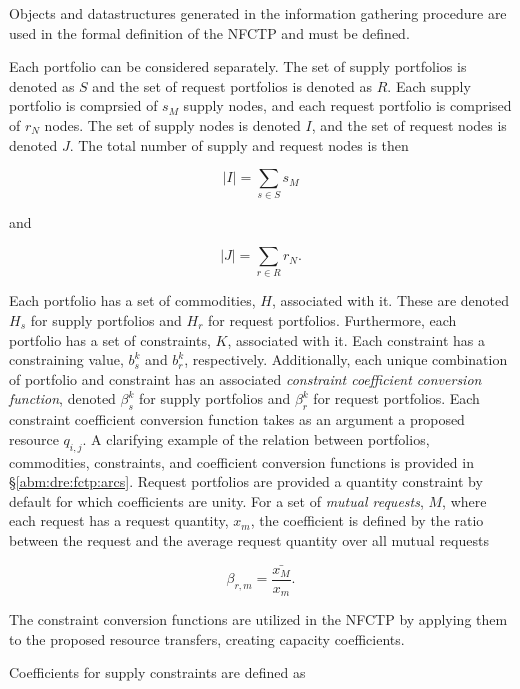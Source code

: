 Objects and datastructures generated in the information gathering procedure are
used in the formal definition of the NFCTP and must be defined.

Each portfolio can be considered separately. The set of supply portfolios is
denoted as $S$ and the set of request portfolios is denoted as $R$. Each supply
portfolio is comprsied of $s_M$ supply nodes, and each request portfolio is
comprised of $r_N$ nodes. The set of supply nodes is denoted $I$, and the set
of request nodes is denoted $J$. The total number of supply and request nodes is
then

\begin{equation}
  \left|{I}\right| = \sum_{s \in S} s_M
\end{equation}

and

\begin{equation}
  \left|{J}\right| = \sum_{r \in R} r_N.
\end{equation}

Each portfolio has a set of commodities, $H$, associated with it. These are
denoted $H_s$ for supply portfolios and $H_r$ for request
portfolios. Furthermore, each portfolio has a set of constraints, $K$,
associated with it. Each constraint has a constraining value, $b_s^k$ and
$b_r^k$, respectively. Additionally, each unique combination of portfolio and
constraint has an associated \textit{constraint coefficient conversion
  function}, denoted $\beta_s^k$ for supply portfolios and $\beta_r^k$ for
request portfolios. Each constraint coefficient conversion function takes as an
argument a proposed resource $q_{i,j}$. A clarifying example of the relation
between portfolios, commodities, constraints, and coefficient conversion
functions is provided in \S \ref{abm:dre:fctp:arcs}. Request portfolios are
provided a quantity constraint by default for which coefficients are unity. For
a set of \textit{mutual requests}, $M$, where each request has a request
quantity, $x_m$, the coefficient is defined by the ratio between the request and
the average request quantity over all mutual requests

\begin{equation}
  \beta_{r, m} = \frac{\bar{x_M}}{x_m}.
\end{equation}

The constraint conversion functions are utilized in the NFCTP by applying them
to the proposed resource transfers, creating capacity coefficients.

Coefficients for supply constraints are defined as

